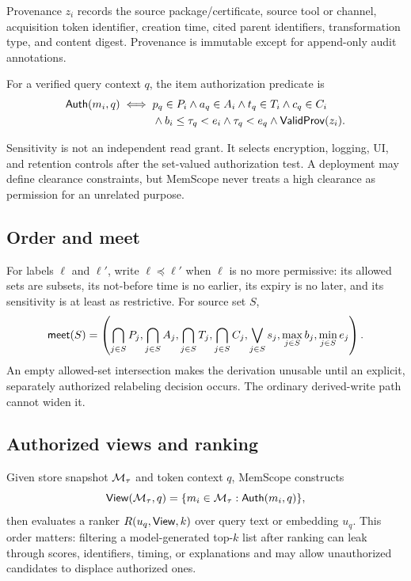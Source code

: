 Provenance $z_i$ records the source package/certificate, source tool or channel, acquisition token identifier, creation time, cited parent identifiers, transformation type, and content digest. Provenance is immutable except for append-only audit annotations.

\begin{definition}[Authorization]
For a verified query context $q$, the item authorization predicate is
\begin{align}
\mathsf{Auth}(m_i,q) \iff {}& p_q\in P_i \wedge a_q\in A_i \wedge t_q\in T_i \wedge c_q\in C_i \notag\\
&\wedge b_i\le \tau_q<e_i \wedge \tau_q<e_q \wedge \mathsf{ValidProv}(z_i).
\label{eq:auth}
\end{align}
\end{definition}

Sensitivity is not an independent read grant. It selects encryption, logging, UI, and retention controls after the set-valued authorization test. A deployment may define clearance constraints, but MemScope never treats a high clearance as permission for an unrelated purpose.

\subsection{Order and meet}

For labels $\ell$ and $\ell'$, write $\ell\preceq\ell'$ when $\ell$ is no more permissive: its allowed sets are subsets, its not-before time is no earlier, its expiry is no later, and its sensitivity is at least as restrictive. For source set $S$,
\begin{equation}
\mathsf{meet}(S)=\left(
\bigcap_{j\in S}P_j,
\bigcap_{j\in S}A_j,
\bigcap_{j\in S}T_j,
\bigcap_{j\in S}C_j,
\bigvee_{j\in S}s_j,
\max_{j\in S}b_j,
\min_{j\in S}e_j
\right).
\label{eq:meet}
\end{equation}
An empty allowed-set intersection makes the derivation unusable until an explicit, separately authorized relabeling decision occurs. The ordinary derived-write path cannot widen it.

\subsection{Authorized views and ranking}

Given store snapshot $\mathcal{M}_\tau$ and token context $q$, MemScope constructs
\begin{equation}
\mathsf{View}(\mathcal{M}_\tau,q)=\{m_i\in\mathcal{M}_\tau:\mathsf{Auth}(m_i,q)\},
\label{eq:view}
\end{equation}
then evaluates a ranker $R(u_q,\mathsf{View},k)$ over query text or embedding $u_q$. This order matters: filtering a model-generated top-$k$ list after ranking can leak through scores, identifiers, timing, or explanations and may allow unauthorized candidates to displace authorized ones.

